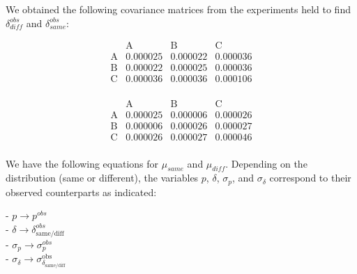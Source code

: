 We obtained the following covariance matrices from the experiments held to find \(\delta^{obs}_{diff}\) and \(\delta^{obs}_{same}\):

\[
\begin{array}{c|ccc}
           & \text{A} & \text{B} & \text{C} \\
\hline
\text{A} & 0.000025 & 0.000022 & 0.000036 \\
\text{B} & 0.000022 & 0.000025 & 0.000036 \\
\text{C} & 0.000036 & 0.000036 & 0.000106 \\
\end{array}
\]
\begin{center}\end{center}


\[
\begin{array}{c|ccc}
           & \text{A} & \text{B} & \text{C} \\
\hline
\text{A} & 0.000025 & 0.000006 & 0.000026 \\
\text{B} & 0.000006 & 0.000026 & 0.000027 \\
\text{C}  & 0.000026 & 0.000027 & 0.000046 \\
\end{array}
\]
\begin{center}\end{center}

We have the following equations for \(\mu_{same}\) and \(\mu_{diff}\). Depending on the distribution (same or different), the variables \(p\), \(\delta\), \(\sigma_p\), and \(\sigma_\delta\) correspond to their observed counterparts as indicated:

- \(p \rightarrow p^{obs}\)\\
- \(\delta \rightarrow \delta_{\text{same/diff}}^{obs}\)\\
- \(\sigma_p \rightarrow \sigma_p^{obs}\)\\
- \(\sigma_\delta \rightarrow \sigma_{\delta_{\text{same/diff}}}^{\text{obs}}\)\\

